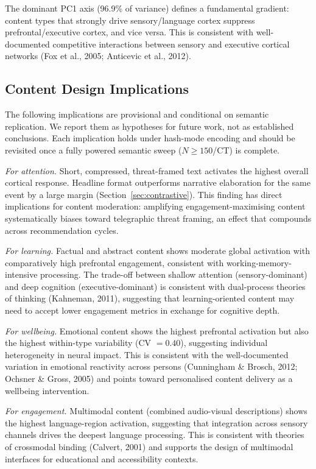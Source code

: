\documentclass[11pt,letterpaper]{article}
\begin{document}
The dominant PC1 axis (96.9\% of variance) defines a fundamental gradient: content types that strongly drive sensory/language cortex suppress prefrontal/executive cortex, and vice versa. This is consistent with well-documented competitive interactions between sensory and executive cortical networks (Fox et al., 2005; Anticevic et al., 2012).

\subsection{Content Design Implications}

The following implications are provisional and conditional on semantic replication. We report them as hypotheses for future work, not as established conclusions. Each implication holds under hash-mode encoding and should be revisited once a fully powered semantic sweep ($N \geq 150$/CT) is complete.

\textit{For attention.} Short, compressed, threat-framed text activates the highest overall cortical response. Headline format outperforms narrative elaboration for the same event by a large margin (Section~\ref{sec:contrastive}). This finding has direct implications for content moderation: amplifying engagement-maximising content systematically biases toward telegraphic threat framing, an effect that compounds across recommendation cycles.

\textit{For learning.} Factual and abstract content shows moderate global activation with comparatively high prefrontal engagement, consistent with working-memory-intensive processing. The trade-off between shallow attention (sensory-dominant) and deep cognition (executive-dominant) is consistent with dual-process theories of thinking (Kahneman, 2011), suggesting that learning-oriented content may need to accept lower engagement metrics in exchange for cognitive depth.

\textit{For wellbeing.} Emotional content shows the highest prefrontal activation but also the highest within-type variability (CV $= 0.40$), suggesting individual heterogeneity in neural impact. This is consistent with the well-documented variation in emotional reactivity across persons (Cunningham \& Brosch, 2012; Ochsner \& Gross, 2005) and points toward personalised content delivery as a wellbeing intervention.

\textit{For engagement.} Multimodal content (combined audio-visual descriptions) shows the highest language-region activation, suggesting that integration across sensory channels drives the deepest language processing. This is consistent with theories of crossmodal binding (Calvert, 2001) and supports the design of multimodal interfaces for educational and accessibility contexts.
\end{document}

